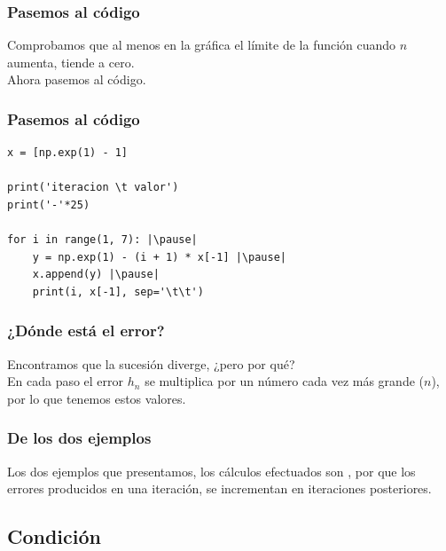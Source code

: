 \documentclass[12pt]{beamer}
\begin{document}
\begin{frame}
\frametitle{Pasemos al código}
Comprobamos que al menos en la gráfica el límite de la función cuando $n$ aumenta, tiende a cero.
\\
\bigskip
\pause
Ahora pasemos al código.
\end{frame}
\begin{frame}[fragile]
\frametitle{Pasemos al código}
\begin{lstlisting}[caption=Código para el ejemplo 2]
x = [np.exp(1) - 1]

print('iteracion \t valor')
print('-'*25)

for i in range(1, 7): |\pause|
	y = np.exp(1) - (i + 1) * x[-1] |\pause|
	x.append(y) |\pause|
	print(i, x[-1], sep='\t\t')
\end{lstlisting}
\end{frame}
\begin{frame}
\frametitle{¿Dónde está el error?}
Encontramos que la sucesión diverge, ¿pero por qué?
\\
\bigskip
\pause
En cada paso el error $h_{n}$ se multiplica por un número cada vez más grande ($n$), por lo que tenemos estos valores.
\end{frame}
\begin{frame}
\frametitle{De los dos ejemplos}
Los dos ejemplos que presentamos, los cálculos efectuados son , \pause por que los errores producidos en una iteración, se incrementan en iteraciones posteriores.
\end{frame}

\subsection{Condición}
\end{document}
